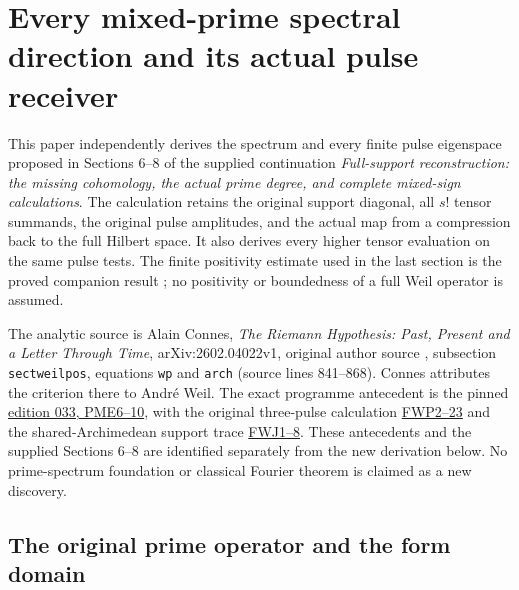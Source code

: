 \section{Every mixed-prime spectral direction and its actual pulse receiver}


This paper independently derives the spectrum and every finite pulse
eigenspace proposed in Sections 6--8 of the supplied continuation
\emph{Full-support reconstruction: the missing cohomology, the actual
prime degree, and complete mixed-sign calculations}.  The calculation
retains the original support diagonal, all $s!$ tensor summands, the
original pulse amplitudes, and the actual map from a compression back
to the full Hilbert space.  It also derives every higher tensor
evaluation on the same pulse tests.  The finite positivity estimate
used in the last section is the proved companion result \cite{FinitePrimePulse};
no positivity or boundedness of a full Weil operator is assumed.

The analytic source is Alain Connes, \emph{The Riemann Hypothesis:
Past, Present and a Letter Through Time}, arXiv:2602.04022v1,
original author source , subsection
\texttt{sectweilpos}, equations \texttt{wp} and \texttt{arch}
(source lines 841--868).  Connes attributes the criterion there to
Andr\'e Weil.  The exact programme antecedent is the pinned
\href{https://github.com/KokunoYumeto/zeta-function-research-reader/blob/3c78cfbd9e194d35117b33277c421c6564ce3dbf/workbenches/splitzero-tandem/continuations/20260923-full-prime-support/033/MIXED_PRIME_ENERGY_AND_BOUNDARY.tex#L209}{edition 033, PME6--10},
with the original three-pulse calculation
\href{https://github.com/KokunoYumeto/zeta-function-research-reader/blob/3c78cfbd9e194d35117b33277c421c6564ce3dbf/workbenches/splitzero-tandem/continuations/20260923-full-prime-support/033/MIXED_PRIME_ENERGY_AND_BOUNDARY.tex#L648}{FWP2--23}
and the shared-Archimedean support trace
\href{https://github.com/KokunoYumeto/zeta-function-research-reader/blob/3c78cfbd9e194d35117b33277c421c6564ce3dbf/workbenches/splitzero-tandem/continuations/20260923-full-prime-support/033/MIXED_PRIME_ENERGY_AND_BOUNDARY.tex#L1005}{FWJ1--8}.
These antecedents and the supplied Sections 6--8 are identified
separately from the new derivation below.  No prime-spectrum foundation
or classical Fourier theorem is claimed as a new discovery.

\subsection{The original prime operator and the form domain}


